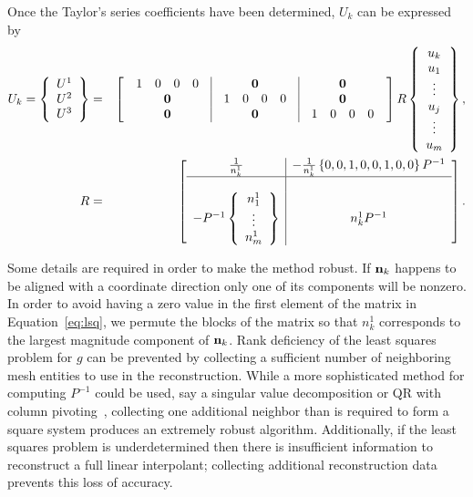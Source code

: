 \documentclass[12pt]{article}
\begin{document}
Once the Taylor's series coefficients have been determined, $U_k$ can
be expressed by
\begin{eqnarray}
U_k = \left\{\begin{array}{c}U^1\\U^2\\U^3\end{array}\right\} &=&
\left[ \begin{array}{c|c|c} \begin{array}{cccc} 1 & 0 & 0 &0\end{array} & {\bf 0} & {\bf 0}\\
                            {\bf 0}& \begin{array}{cccc} 1 & 0 & 0&0\end{array} & {\bf 0}\\
                            {\bf 0}& {\bf 0}&\begin{array}{cccc} 1 & 0 & 0&0\end{array}\end{array}\right]R
\left\{\begin{array}{c} u_k\\u_1\\\vdots\\u_j\\\vdots\\u_m\end{array}\right\},\\
R &=& \left[\begin{array}{c|c} \frac{1}{n_k^1} & -\frac{1}{n_k^1} \left\{0,0,1,0,0,1,0,0\right\}P^{-1}\\
                              \hline\\
                              -P^{-1}\left\{\begin{array}{c} n^1_1\\\vdots\\n^1_m\end{array}\right\} &
                              n^1_k P^{-1}\end{array}\right].
\end{eqnarray}

Some details are required in order to make the method robust.  If
${\bf n}_k$ happens to be aligned with a coordinate direction only one
of its components will be nonzero.  In order to avoid having a zero
value in the first element of the matrix in Equation~\ref{eq:lsq}, we
permute the blocks of the matrix so that $n^1_k$ corresponds to the
largest magnitude component of ${\bf n}_k$.  Rank deficiency of the
least squares problem for $g$ can be prevented by collecting a
sufficient number of neighboring mesh entities to use in the
reconstruction.  While a more sophisticated method for computing
$P^{-1}$ could be used, say a singular value decomposition or QR with
column pivoting~\cite{matrixcomp}, collecting one additional neighbor
than is required to form a square system produces an extremely robust
algorithm.  Additionally, if the least squares problem is
underdetermined then there is insufficient information to reconstruct
a full linear interpolant; collecting additional reconstruction data
prevents this loss of accuracy.
\end{document}
